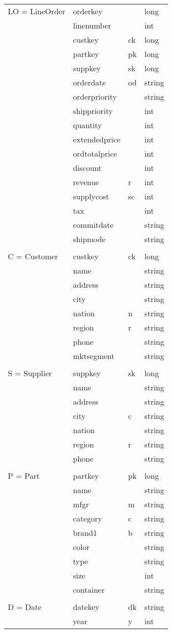 \begin{tabular}{llll}
LO = LineOrder & orderkey & & long\\
& linenumber& &int\\
& custkey& ck& long\\
& partkey& pk& long\\
& suppkey& sk& long\\
& orderdate& od& string\\
& orderpriority& & string\\
& shippriority& & int\\
& quantity& & int\\
& extendedprice& & int\\
& ordtotalprice& & int\\
& discount& & int\\
& revenue& r& int\\
& supplycost& sc& int\\
& tax& & int\\
& commitdate& & string\\
& shipmode& & string\\\\
C = Customer & custkey&ck& long\\
& name& &string\\
& address& &string\\
& city& &string\\
& nation& n&string\\
& region& r&string\\
& phone& &string\\
& mktsegment& &string\\\\
S = Supplier & suppkey &sk& long\\
& name& &string\\
& address& &string\\
& city& c&string\\
& nation& &string\\
& region& r&string\\
& phone& &string\\\\
P = Part & partkey& pk&long\\
& name& &string\\
& mfgr& m&string\\
& category& c&string\\
& brand1& b&string\\
& color& &string\\
& type& &string\\
& size& &int\\
& container& &string\\\\
D = Date & datekey & dk&string\\
& year& y& int\\
\end{tabular}
\pagebreak

